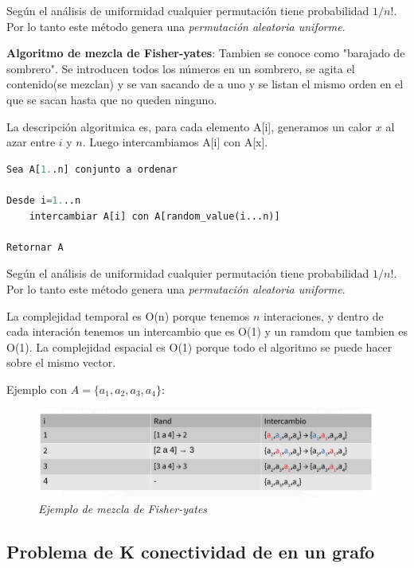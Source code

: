 \documentclass{article}
\begin{document}
Según el análisis de uniformidad cualquier permutación tiene probabilidad \(1/n!\).
Por lo tanto este método genera una \textit{permutación aleatoria uniforme}.

\textbf{Algoritmo de mezcla de Fisher-yates}: Tambien se conoce como "barajado de sombrero".
Se introducen todos los números en un sombrero, se agita el contenido(se mezclan) y se van sacando
de a uno y se listan el mismo orden en el que se sacan hasta que no queden ninguno.

La descripción algoritmica es, para cada elemento A[i], generamos un calor \(x\) al azar entre \(i\) y \(n\). 
Luego intercambiamos A[i] con A[x].

\begin{lstlisting}[language=Python, caption=Algoritmo de Fisher-yates]
Sea A[1..n] conjunto a ordenar

Desde i=1...n
    intercambiar A[i] con A[random_value(i...n)]

Retornar A
\end{lstlisting}    

Según el análisis de uniformidad cualquier permutación tiene probabilidad \(1/n!\).
Por lo tanto este método genera una \textit{permutación aleatoria uniforme}.

La complejidad temporal es O(n) porque tenemos \(n\) interaciones, y dentro de cada interación
tenemos un intercambio que es O(1) y un ramdom que tambien es O(1). La complejidad espacial 
es O(1) porque todo el algoritmo se puede hacer sobre el mismo vector.

Ejemplo con \(A=\{a_1,a_2,a_3,a_4\}\):
\begin{figure}[h!]
    \begin{center} 
    \includegraphics[scale=0.3]{imagenes/ejemplo-mezcla-aleatoria.png}
    \caption{\small \sl Ejemplo de mezcla de Fisher-yates} 
    \end{center}
\end{figure}

\subsection{Problema de K conectividad de en un grafo}
\end{document}
